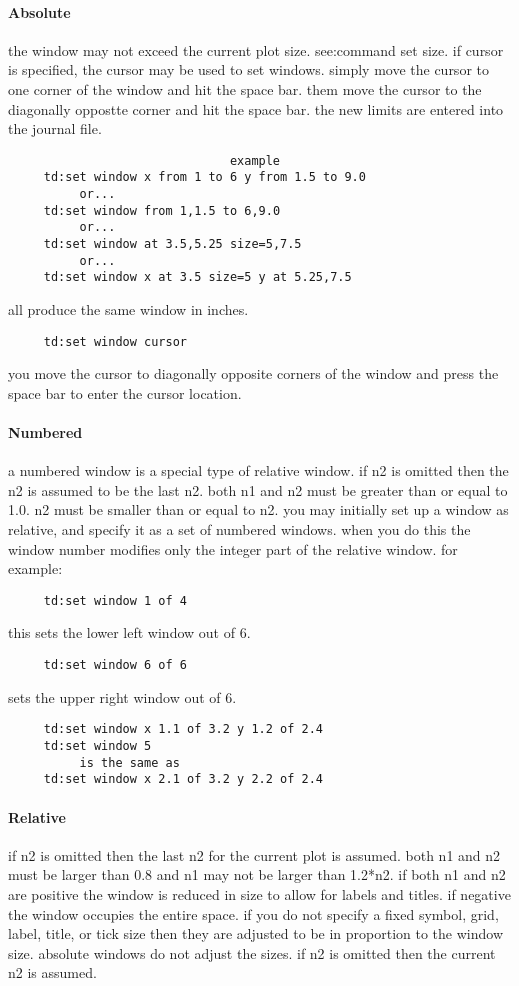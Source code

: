 \paragraph{Absolute}
the    window    may    not    exceed    the   current   plot   size.
see:command set size.  if cursor is specified, the cursor may be used
to  set  windows.  simply move the cursor to one corner of the window
and hit the space bar.   them  move  the  cursor  to  the  diagonally
oppostte  corner  and  hit the space bar.  the new limits are entered
into the journal file.  

\begin{verbatim}
                               example
     td:set window x from 1 to 6 y from 1.5 to 9.0 
          or...  
     td:set window from 1,1.5 to 6,9.0 
          or...  
     td:set window at 3.5,5.25 size=5,7.5 
          or...  
     td:set window x at 3.5 size=5 y at 5.25,7.5 
\end{verbatim}
all produce the same window in inches.  
\begin{verbatim}
     td:set window cursor 
\end{verbatim}
you  move the cursor to diagonally opposite corners of the window and
press the space bar to enter the cursor location.  
\paragraph{Numbered}
a  numbered  window  is  a special type of relative window.  if n2 is
omitted then the n2 is assumed to be the last n2.   both  n1  and  n2
must  be  greater  than  or equal to 1.0.  n2 must be smaller than or
equal to n2.  you may initially set up  a  window  as  relative,  and
specify it as a set of numbered windows.  when you do this the window
number modifies only the integer part of the  relative  window.   for
example:  
\begin{verbatim}
     td:set window 1 of 4 
\end{verbatim}
this sets the lower left window out of 6.  
\begin{verbatim}
     td:set window 6 of 6 
\end{verbatim}
sets the upper right window out of 6.  
\begin{verbatim}
     td:set window x 1.1 of 3.2 y 1.2 of 2.4 
     td:set window 5 
          is the same as 
     td:set window x 2.1 of 3.2 y 2.2 of 2.4 
\end{verbatim}
\paragraph{Relative}
if  n2  is  omitted then the last n2 for the current plot is assumed.
both n1 and n2 must be larger than 0.8 and n1 may not be larger  than
1.2*n2.  if both n1 and n2 are positive the window is reduced in size
to allow for labels and titles.  if negative the window occupies  the
entire  space.   if  you  do not specify a fixed symbol, grid, label,
title, or tick size then they are adjusted to be in proportion to the
window  size.   absolute  windows  do not adjust the sizes.  if n2 is
omitted then the current n2 is assumed.  

